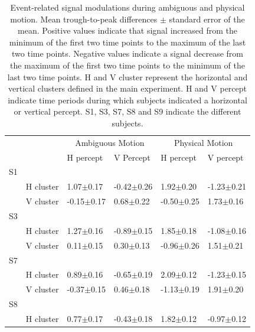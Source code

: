 \begin{table}[htbp!]
\centering
\caption{Event-related signal modulations during ambiguous and physical motion. Mean trough-to-peak differences $\pm$ standard error of the mean. Positive values indicate that signal increased from the minimum of the first two time points to the maximum of the last two time points. Negative values indicate a signal decrease from the maximum of the first two time points to the minimum of the last two time points. H and V cluster represent the horizontal and vertical clusters defined in the main experiment. H and V percept indicate time periods during which subjects indicated a horizontal or vertical percept. S1, S3, S7, S8 and S9 indicate the different subjects.}
\begin{tabular}{lrllll}
\\
\toprule
\multicolumn{2}{l}{} & \multicolumn{2}{c}{Ambiguous Motion} & \multicolumn{2}{c}{Physical Motion} \\
    &                & { }H percept     & { }V Percept     & { }H percept     & { }V percept \\
\midrule
S1  &                &                  &                  &                  &                  \\
    & H cluster      & { }1.07$\pm$0.17 &   -0.42$\pm$0.26 & { }1.92$\pm$0.20 &   -1.23$\pm$0.21 \\
    & V cluster      &   -0.15$\pm$0.17 & { }0.68$\pm$0.22 &   -0.50$\pm$0.25 & { }1.73$\pm$0.16 \\
\hline
S3  &                &                  &                  &                  &                  \\
    & H cluster      & { }1.27$\pm$0.16 &   -0.89$\pm$0.15 & { }1.85$\pm$0.18 &   -1.08$\pm$0.16 \\
    & V cluster      & { }0.11$\pm$0.15 & { }0.30$\pm$0.13 &   -0.96$\pm$0.26 & { }1.51$\pm$0.21 \\
\hline
S7  &                &                  &                  &                  &                  \\
    & H cluster      & { }0.89$\pm$0.16 &   -0.65$\pm$0.19 & { }2.09$\pm$0.12 &   -1.23$\pm$0.15 \\
    & V cluster      &   -0.37$\pm$0.15 & { }0.46$\pm$0.18 &   -1.13$\pm$0.19 & { }1.91$\pm$0.20 \\
\hline
S8  &                &                  &                  &                  &                  \\
    & H cluster      & { }0.77$\pm$0.17 &   -0.43$\pm$0.18 & { }1.82$\pm$0.12 &   -0.97$\pm$0.12 \\

\end{tabular}
\end{table}
